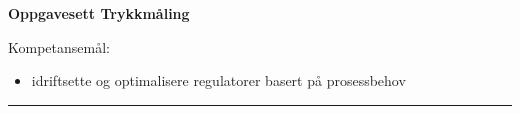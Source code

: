 \begin{center}
\LARGE
\centerline\textbf{Oppgavesett Trykkmåling}
\end{center}
\normalsize

\vskip 2cm 
Kompetansemål:
\begin{itemize}[noitemsep]
	\item idriftsette og optimalisere regulatorer basert på prosessbehov
\end{itemize}
\bigskip 
\hrule
\vfil \eject
